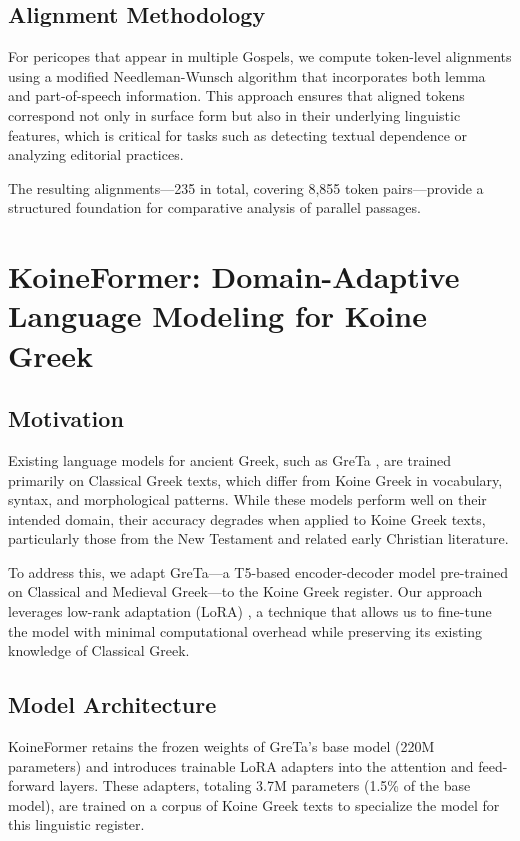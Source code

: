 \documentclass[11pt,letterpaper]{article}
\begin{document}
\subsection{Alignment Methodology}

For pericopes that appear in multiple Gospels, we compute token-level alignments using a modified Needleman-Wunsch algorithm that incorporates both lemma and part-of-speech information. This approach ensures that aligned tokens correspond not only in surface form but also in their underlying linguistic features, which is critical for tasks such as detecting textual dependence or analyzing editorial practices.

The resulting alignments—235 in total, covering 8,855 token pairs—provide a structured foundation for comparative analysis of parallel passages.

\section{KoineFormer: Domain-Adaptive Language Modeling for Koine Greek}
\label{sec:model}

\subsection{Motivation}

Existing language models for ancient Greek, such as GreTa \citep{riemenschneider2023}, are trained primarily on Classical Greek texts, which differ from Koine Greek in vocabulary, syntax, and morphological patterns. While these models perform well on their intended domain, their accuracy degrades when applied to Koine Greek texts, particularly those from the New Testament and related early Christian literature.

To address this, we adapt GreTa—a T5-based encoder-decoder model pre-trained on Classical and Medieval Greek—to the Koine Greek register. Our approach leverages low-rank adaptation (LoRA) \citep{hu2021lora}, a technique that allows us to fine-tune the model with minimal computational overhead while preserving its existing knowledge of Classical Greek.

\subsection{Model Architecture}

KoineFormer retains the frozen weights of GreTa's base model (220M parameters) and introduces trainable LoRA adapters into the attention and feed-forward layers. These adapters, totaling 3.7M parameters (1.5\% of the base model), are trained on a corpus of Koine Greek texts to specialize the model for this linguistic register.
\end{document}
